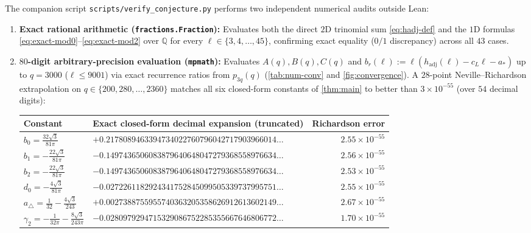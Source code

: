 \documentclass[11pt,a4paper]{article}
\numberwithin{equation}{section}
\theoremstyle{plain}
\theoremstyle{definition}
\theoremstyle{remark}
\newcommand{\hadj}{h_{\mathrm{adj}}}
\newcommand{\tri}{a_{\triangle}}
\newcommand{\code}[1]{\texttt{\small #1}}
\begin{document}
The companion script \code{scripts/verify\_conjecture.py} performs two independent numerical audits outside Lean:
\begin{enumerate}[label=(\arabic*)]
  \item \textbf{Exact rational arithmetic (\code{fractions.Fraction}):} Evaluates both the direct $2\mathrm{D}$ trinomial sum \eqref{eq:hadj-def} and the $1\mathrm{D}$ formulas \eqref{eq:exact-mod0}--\eqref{eq:exact-mod2} over $\mathbb{Q}$ for every $\ell\in\{3,4,\dots,45\}$, confirming exact equality ($0/1$ discrepancy) across all $43$ cases.
  \item \textbf{$80$-digit arbitrary-precision evaluation (\code{mpmath}):} Evaluates $A(q),B(q),C(q)$ and $b_r(\ell):=\ell(\hadj(\ell)-c_L\ell-a_*)$ up to $q=3000$ ($\ell\le 9001$) via exact recurrence ratios from $p_{3q}(q)$ (\cref{tab:num-conv} and \cref{fig:convergence}). A $28$-point Neville--Richardson extrapolation on $q\in\{200,280,\dots,2360\}$ matches all six closed-form constants of \cref{thm:main} to better than $3\times 10^{-55}$ (over $54$ decimal digits):
  \begin{center}
  \footnotesize
  \begin{tabular}{@{}l l r@{}}
    \toprule
    Constant & Exact closed-form decimal expansion (truncated) & Richardson error \\
    \midrule
    $b_0 = \frac{32\sqrt{3}}{81\pi}$ & $+0.2178089463394734022760796042717903966014\ldots$ & $2.55\times 10^{-55}$ \\
    $b_1 = -\frac{22\sqrt{3}}{81\pi}$ & $-0.1497436506083879640648047279368558976634\ldots$ & $2.56\times 10^{-55}$ \\
    $b_2 = -\frac{22\sqrt{3}}{81\pi}$ & $-0.1497436506083879640648047279368558976634\ldots$ & $2.53\times 10^{-55}$ \\
    $d_0 = -\frac{4\sqrt{3}}{81\pi}$ & $-0.0272261182924341752845099505339737995751\ldots$ & $2.55\times 10^{-55}$ \\
    $\tri = \frac{1}{32}-\frac{4\sqrt{3}}{243}$ & $+0.0027388755955740363205358626912613602149\ldots$ & $2.67\times 10^{-55}$ \\
    $\gamma_2 = -\frac{1}{32\pi}-\frac{8\sqrt{3}}{243\pi}$ & $-0.0280979294715329086752285355667646806772\ldots$ & $1.70\times 10^{-55}$ \\
    \bottomrule
  \end{tabular}
  \end{center}
\end{enumerate}
\end{document}
